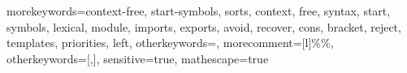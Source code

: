  {
	morekeywords={context-free, start-symbols, sorts, context, free, syntax, start,
	symbols, lexical, module, imports, exports, avoid, recover, cons, bracket, reject, templates, priorities, left}, otherkeywords={}, morecomment=[l]{\%\%},	
	otherkeywords={[,]},
	sensitive=true,
	mathescape=true
}

\newcommand{\sdfcode}[1]{\lstinline[language=SDF,basicstyle=\lstinlinestyle,breaklines=false]{#1}}
\newcommand{\sdfcodebl}[1]{\lstinline[language=SDF,basicstyle=\lstinlinestyle,breaklines=true]{#1}}
\newcommand{\SDF}{\langname{SDF}}
